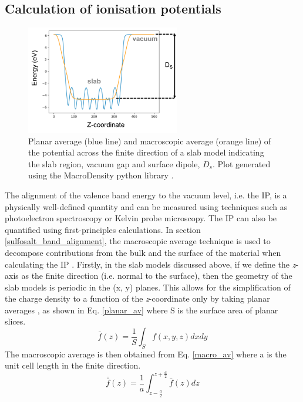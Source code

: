 \documentclass[11pt, twoside]{report}
\begin{document}
\subsection{Calculation of ionisation potentials}

\begin{figure}[h!]
  \centering
    \includegraphics[width=0.6\textwidth]{figures/MD_eg.png}
    \caption[Planar average (blue line) and macroscopic average (orange line) of the potential across the finite direction of a slab model indicating the slab region, vacuum gap and surface dipole, $D_s$.]{Planar average (blue line) and macroscopic average (orange line) of the potential across the finite direction of a slab model indicating the slab region, vacuum gap and surface dipole, $D_s$. Plot generated using the MacroDensity python library \cite{MacroDensity}.}
  \label{MD_eg}
\end{figure}

The alignment of the valence band energy to the vacuum level, i.e. the IP, is a physically well-defined quantity and can be measured using techniques such as photoelectron spectroscopy or Kelvin probe microscopy. The IP can also be quantified using first-principles calculations. In section \ref{sulfosalt_band_alignment}, the macroscopic average technique is used to decompose contributions from the bulk and the surface of the material when calculating the IP \cite{macro_pot_IP}.
Firstly, in the slab models discussed above, if we define the \textit{z}-axis as the finite direction (i.e. normal to the surface), then the geometry of the slab models is periodic in the (x, y) planes. This allows for the simplification of the charge density to a function of the \textit{z}-coordinate only by taking planar averages \cite{band_engineering}, as shown in Eq. \ref{planar_av} where S is the surface area of planar slices.
\begin{equation}\label{planar_av}
\bar{f}(z) = \frac{1}{S}\int_S f(x,y,z)dxdy
\end{equation}
The macroscopic average is then obtained from Eq. \ref{macro_av} where a is the unit cell length in the finite direction.
\begin{equation}\label{macro_av}
\bar{\bar{f}}(z) = \frac{1}{a} \int_{z-\frac{a}{2}}^{z+\frac{a}{2}}  \bar{f}(z) dz
\end{equation}
\end{document}
